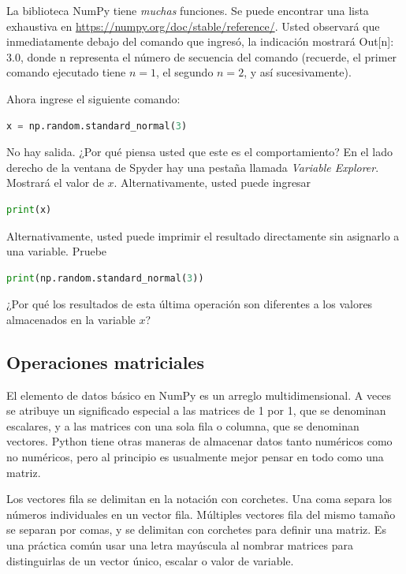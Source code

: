 La biblioteca NumPy tiene \textit{muchas} funciones. Se puede encontrar una lista exhaustiva en \url{https://numpy.org/doc/stable/reference/}. Usted observará que inmediatamente debajo del comando que ingresó, la indicación mostrará {\s Out[n]: 3.0}, donde {\s n} representa el número de secuencia del comando (recuerde, el primer comando ejecutado tiene $n=1$, el segundo $n=2$, y así sucesivamente).

Ahora ingrese el siguiente comando:

\begin{lstlisting}[language=Python]
	x = np.random.standard_normal(3)
\end{lstlisting}

No hay salida. ¿Por qué piensa usted que este es el comportamiento? \QA En el lado derecho de la ventana de Spyder hay una pestaña llamada \textit{Variable Explorer}. Mostrará el valor de $x$. Alternativamente, usted puede ingresar

\begin{lstlisting}[language=Python]
	print(x)
\end{lstlisting}

Alternativamente, usted puede imprimir el resultado directamente sin asignarlo a una variable. Pruebe

\begin{lstlisting}[language=Python]
	print(np.random.standard_normal(3))
\end{lstlisting}

¿Por qué los resultados de esta última operación son diferentes a los valores almacenados en la variable $x$? \QA



\subsection{Operaciones matriciales}

El elemento de datos básico en NumPy es un arreglo multidimensional.
A veces se atribuye un significado especial a las matrices de 1 por 1, que se
denominan escalares, y a las matrices con una sola fila o columna, que
se denominan vectores. Python tiene otras maneras de almacenar datos tanto numéricos
como no numéricos, pero al principio es usualmente mejor
pensar en todo como una matriz.

Los vectores fila se delimitan en la notación con corchetes. Una coma separa los números individuales en un vector fila. Múltiples vectores fila del mismo tamaño se separan por comas, y se delimitan con corchetes para definir una matriz. Es una práctica común usar una letra mayúscula al nombrar matrices para distinguirlas de un vector único, escalar o valor de variable.


